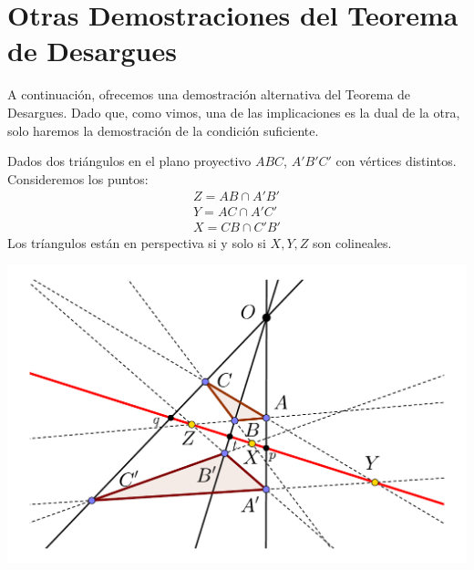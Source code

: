 \section{Otras Demostraciones del Teorema de Desargues}
A continuación, ofrecemos una demostración alternativa del Teorema de Desargues. Dado que, como vimos, una de las implicaciones es la dual de la otra, solo haremos la demostración de la condición suficiente.
\begin{theo}
	Dados dos triángulos en el plano proyectivo $ABC$, $A'B'C'$ con vértices distintos. Consideremos los puntos:
	\[\begin{array}{c}
	Z=AB\cap A'B'\\
	Y=AC\cap A'C'\\
	X=CB\cap C'B'
	\end{array}\]
	Los tríangulos están en perspectiva si y solo si $X,Y,Z$ son colineales.
	\begin{center}
		\includegraphics[scale=.45]{Graficos/Desargues/desargues2}
	\end{center}
\end{theo}
